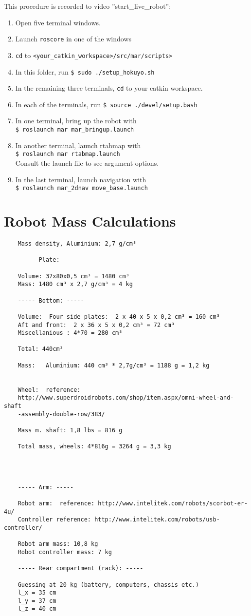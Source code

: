 This procedure is recorded to video ''start\_live\_robot'': 

\begin{enumerate}
	\item Open five terminal windows.
	\item Launch \texttt{roscore} in one of the windows
	\item \texttt{cd} to \texttt{<your\_catkin\_workspace>/src/mar/scripts>}
	\item In this folder, run \texttt{\$ sudo ./setup\_hokuyo.sh}
	\item In the remaining three terminals, \texttt{cd} to your catkin workspace.
	\item In each of the terminals, run \texttt{\$ source ./devel/setup.bash}
	\item In one terminal, bring up the robot with\\ \texttt{\$ roslaunch mar mar\_bringup.launch}
	\item In another terminal, launch rtabmap with\\ \texttt{\$ roslaunch mar rtabmap.launch}\\
	Consult the launch file to see argument options.
	\item In the last terminal, launch navigation with\\ \texttt{\$ roslaunch mar\_2dnav move\_base.launch}
\end{enumerate}

\chapter{Robot Mass Calculations}
\label{chp:mass}
\begin{verbatim}
	Mass density, Aluminium: 2,7 g/cm³
	
	----- Plate: -----
	
	Volume: 37x80x0,5 cm³ = 1480 cm³
	Mass: 1480 cm³ x 2,7 g/cm³ = 4 kg
	
	----- Bottom: ----- 
	
	Volume:  Four side plates:  2 x 40 x 5 x 0,2 cm³ = 160 cm³
	Aft and front:  2 x 36 x 5 x 0,2 cm³ = 72 cm³
	Miscellanious :	4*70 = 280 cm³
	
	Total: 440cm³
	
	Mass:   Aluminium: 440 cm³ * 2,7g/cm³ = 1188 g = 1,2 kg
	
	
	Wheel:	reference: 
	http://www.superdroidrobots.com/shop/item.aspx/omni-wheel-and-shaft
	-assembly-double-row/383/
	
	Mass m. shaft: 1,8 lbs = 816 g	
	
	Total mass, wheels: 4*816g = 3264 g = 3,3 kg 
	
	
	
	
	----- Arm: -----
	
	Robot arm:	reference: http://www.intelitek.com/robots/scorbot-er-4u/
	Controller reference: http://www.intelitek.com/robots/usb-controller/
	
	Robot arm mass: 10,8 kg
	Robot controller mass: 7 kg
	
	----- Rear compartment (rack): -----
	
	Guessing at 20 kg (battery, computers, chassis etc.)
	l_x = 35 cm
	l_y = 37 cm
	l_z = 40 cm
\end{verbatim}